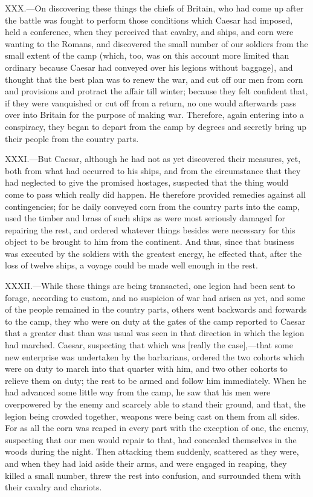 XXX.—On discovering these things the chiefs of Britain, who had come up
after the battle was fought to perform those conditions which Caesar had
imposed, held a conference, when they perceived that cavalry, and ships,
and corn were wanting to the Romans, and discovered the small number of
our soldiers from the small extent of the camp (which, too, was on this
account more limited than ordinary because Caesar had conveyed over his
legions without baggage), and thought that the best plan was to renew
the war, and cut off our men from corn and provisions and protract the
affair till winter; because they felt confident that, if they were
vanquished or cut off from a return, no one would afterwards pass over
into Britain for the purpose of making war. Therefore, again entering
into a conspiracy, they began to depart from the camp by degrees and
secretly bring up their people from the country parts.

XXXI.—But Caesar, although he had not as yet discovered their measures,
yet, both from what had occurred to his ships, and from the circumstance
that they had neglected to give the promised hostages, suspected that
the thing would come to pass which really did happen. He therefore
provided remedies against all contingencies; for he daily conveyed corn
from the country parts into the camp, used the timber and brass of such
ships as were most seriously damaged for repairing the rest, and ordered
whatever things besides were necessary for this object to be brought to
him from the continent. And thus, since that business was executed by
the soldiers with the greatest energy, he effected that, after the loss
of twelve ships, a voyage could be made well enough in the rest.

XXXII.—While these things are being transacted, one legion had been
sent to forage, according to custom, and no suspicion of war had arisen
as yet, and some of the people remained in the country parts, others
went backwards and forwards to the camp, they who were on duty at the
gates of the camp reported to Caesar that a greater dust than was usual
was seen in that direction in which the legion had marched. Caesar,
suspecting that which was [really the case],—that some new enterprise
was undertaken by the barbarians, ordered the two cohorts which were on
duty to march into that quarter with him, and two other cohorts to
relieve them on duty; the rest to be armed and follow him immediately.
When he had advanced some little way from the camp, he saw that his men
were overpowered by the enemy and scarcely able to stand their ground,
and that, the legion being crowded together, weapons were being cast on
them from all sides. For as all the corn was reaped in every part with
the exception of one, the enemy, suspecting that our men would repair to
that, had concealed themselves in the woods during the night. Then
attacking them suddenly, scattered as they were, and when they had laid
aside their arms, and were engaged in reaping, they killed a small
number, threw the rest into confusion, and surrounded them with their
cavalry and chariots.

